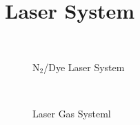 \chapter{Laser System}




\begin{figure}
\begin{center}
\leavevmode
\epsfxsize=4in
~\\
\caption[N$_2$/Dye Laser System]
        {N$_2$/Dye Laser System
        } 
        
\end{center}
\end{figure}


\begin{figure}
\begin{center}
\leavevmode
\epsfxsize=6in
~\\
\caption[Laser Gas System]
        {Laser Gas Systeml
        } 
        
\end{center}
\end{figure}

